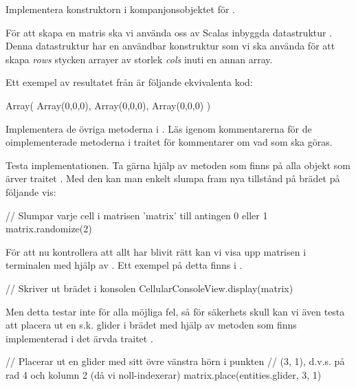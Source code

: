 \Subtask Implementera konstruktorn i kompanjonsobjektet för .

För att skapa en matris ska vi använda oss av Scalas inbyggda datastruktur . Denna datastruktur har en användbar konstruktur  som vi ska använda för att skapa \emph{rows} stycken arrayer av storlek \emph{cols} inuti en annan array.

Ett exempel av resultatet från  är följande ekvivalenta kod:

\begin{Code}
Array(
	Array(0,0,0),
	Array(0,0,0),
	Array(0,0,0)	
)
\end{Code}



\Subtask Implementera de övriga metoderna i . Läs igenom kommentarerna för de oimplementerade metoderna i traitet  för kommentarer om vad som ska göras.


\Subtask Testa implementationen. Ta gärna hjälp av metoden  som finns på alla objekt som ärver traitet . Med den kan man enkelt slumpa fram nya tillstånd på brädet på följande vis:

\begin{Code}
// Slumpar varje cell i matrisen 'matrix' till antingen 0 eller 1
matrix.randomize(2)
\end{Code}

För att nu kontrollera att allt har blivit rätt kan vi visa upp matrisen i terminalen med hjälp av . Ett exempel på detta finns i .

\begin{Code}
// Skriver ut brädet i konsolen
CellularConsoleView.display(matrix)
\end{Code}

Men detta testar inte för alla möjliga fel, så för säkerhets skull kan vi även testa att placera ut en s.k. glider i brädet med hjälp av metoden  som finns implementerad i det ärvda traitet .

\begin{Code}
// Placerar ut en glider med sitt övre vänstra hörn i punkten
// (3, 1), d.v.s. på rad 4 och kolumn 2 (då vi noll-indexerar)
matrix.place(entities.glider, 3, 1)
\end{Code}

